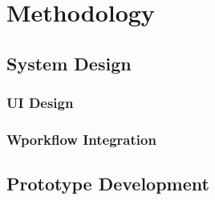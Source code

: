 \newpage
\section{Methodology} 

\subsection{System Design}
\subsubsection{UI Design}
\subsubsection{Wporkflow Integration}
\subsection{Prototype Development}
